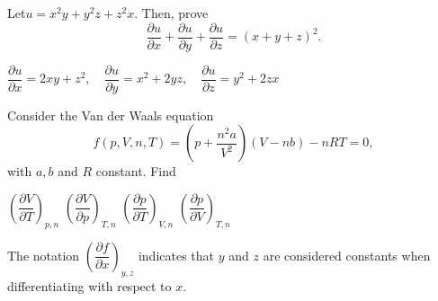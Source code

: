 \begin{Exercise}[difficulty = 2] Let$u=x^2y+y^2z+z^2x$. Then, prove  $$\dfrac{\partial u}{\partial x}+\dfrac{\partial u}{\partial y}+\dfrac{\partial u}{\partial z} = (x+y+z)^2.$$ 
\end{Exercise}

\begin{Answer}

    $\dfrac{\partial u}{ \partial x} = 2xy + z^2, \quad \dfrac{\partial u}{ \partial y} = x^2 + 2yz, \quad \dfrac{\partial u}{ \partial z} = y^2 + 2zx $
\end{Answer}

\fi

\begin{Exercise}[difficulty = 3] Consider the Van der Waals equation
\[ f(p,V,n,T) = \left( p+\dfrac{n^2a}{V^2}\right)(V-nb) - nRT = 0, \]
with $a, b$ and $R$ constant. Find
\begin{multicols}{2}
    \Question $\left(\dfrac{\partial V}{\partial T}\right)_{p,n}$
    \Question $\left(\dfrac{\partial V}{\partial p}\right)_{T,n}$
    \Question $\left(\dfrac{\partial p}{\partial T}\right)_{V,n}$
    \Question $\left(\dfrac{\partial p}{\partial V}\right)_{T,n}$
    \EndCurrentQuestion
\end{multicols}
The notation $\left(\dfrac{\partial f}{\partial x}\right)_{y,z}$ indicates that $y$ and $z$ are considered constants when differentiating with respect  to $x$.
\end{Exercise}

